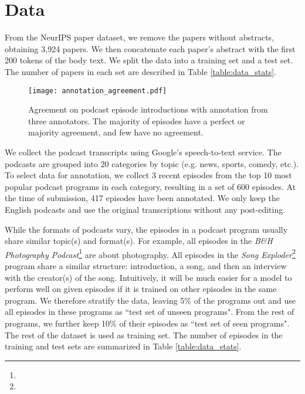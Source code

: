 \section{Data} \label{sec:data}
From the NeurIPS paper dataset, we remove the papers without abstracts, obtaining 3,924 papers. We then concatenate each paper's abstract with the first 200 tokens of the body text. We split the data into a training set and a test set. The number of papers in each set are described in Table \ref{table:data_stats}.

\begin{figure}
  \centering
    \texttt{[image: annotation\_agreement.pdf]}
      \caption{Agreement on podcast episode introductions with annotation from three annotators. The majority of episodes have a perfect or majority agreement, and few have no agreement.}
    \label{fig:annotation_agreement}
\end{figure}

We collect the podcast transcripts using Google's speech-to-text service. The podcasts are grouped into 20 categories by topic (e.g. news, sports, comedy, etc.). To select data for annotation, we collect 3 recent episodes from the top 10 most popular podcast programs in each category, resulting in a set of 600 episodes. At the time of submission, 417 episodes have been annotated. We only keep the English podcasts and use the original transcriptions without any post-editing.

While the formats of podcasts vary, the episodes in a podcast program usually share similar topic(s) and format(s). For example, all episodes in the \emph{B\&H Photography Podcast}\footnote{}
are about photography. All episodes in the \emph{Song Exploder}\footnote{}
program share a similar structure: introduction, a song, and then an interview with the creator(s) of the song. Intuitively, it will be much easier for a model to perform well on given episodes if it is trained on other episodes in the same program. We therefore stratify the data, leaving 5\% of the programs out and use all episodes in these programs as ``test set of unseen programs". From the rest of programs, we further keep 10\% of their episodes as ``test set of seen programs". The rest of the dataset is used as training set. The number of episodes in the training and test sets are summarized in Table \ref{table:data_stats}.


